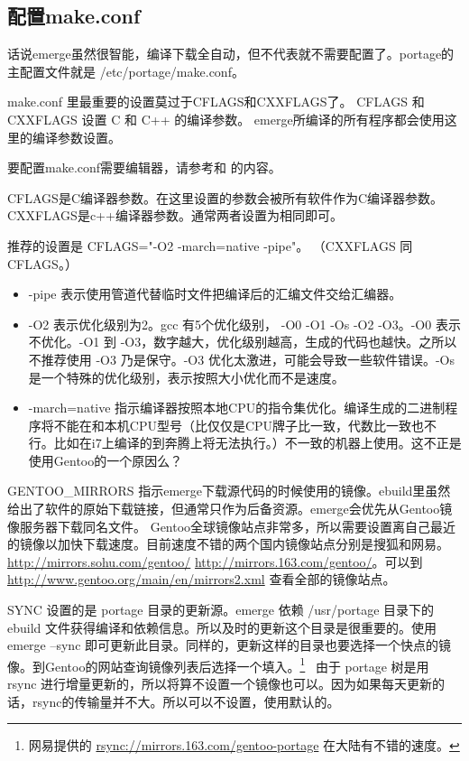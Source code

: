 \subsection{配置make.conf}

话说emerge虽然很智能，编译下载全自动，但不代表就不需要配置了。portage的主配置文件就是 /etc/portage/make.conf。

make.conf 里最重要的设置莫过于CFLAGS和CXXFLAGS了。 
CFLAGS 和 CXXFLAGS 设置 C 和 C++ 的编译参数。
emerge所编译的所有程序都会使用这里的编译参数设置。

要配置make.conf需要编辑器，请参考和
的内容。

CFLAGS是C编译器参数。在这里设置的参数会被所有软件作为C编译器参数。CXXFLAGS是c++编译器参数。通常两者设置为相同即可。

推荐的设置是 CFLAGS="-O2 -march=native -pipe"。
（CXXFLAGS 同 CFLAGS。）

\begin{itemize}
\item -pipe 表示使用管道代替临时文件把编译后的汇编文件交给汇编器。
\item -O2 表示优化级别为2。gcc 有5个优化级别， -O0 -O1 -Os -O2 -O3。-O0 表示不优化。-O1 到 -O3，数字越大，优化级别越高，生成的代码也越快。之所以不推荐使用 -O3 乃是保守。-O3 优化太激进，可能会导致一些软件错误。-Os是一个特殊的优化级别，表示按照大小优化而不是速度。
\item -march=native 指示编译器按照本地CPU的指令集优化。编译生成的二进制程序将不能在和本机CPU型号（比仅仅是CPU牌子比一致，代数比一致也不行。比如在i7上编译的到奔腾上将无法执行。）不一致的机器上使用。这不正是使用Gentoo的一个原因么？
\end{itemize}


GENTOO\_MIRRORS 指示emerge下载源代码的时候使用的镜像。ebuild里虽然给出了软件的原始下载链接，但通常只作为后备资源。emerge会优先从Gentoo镜像服务器下载同名文件。
Gentoo全球镜像站点非常多，所以需要设置离自己最近的镜像以加快下载速度。目前速度不错的两个国内镜像站点分别是搜狐和网易。\url{http://mirrors.sohu.com/gentoo/} \url{http://mirrors.163.com/gentoo/}。可以到 \url{http://www.gentoo.org/main/en/mirrors2.xml} 查看全部的镜像站点。

SYNC %
设置的是 portage 目录的更新源。emerge 依赖 /usr/portage 目录下的 ebuild 文件获得编译和依赖信息。所以及时的更新这个目录是很重要的。使用 emerge --sync 
即可更新此目录。同样的，更新这样的目录也要选择一个快点的镜像。到Gentoo的网站查询镜像列表后选择一个填入。\footnote{网易提供的 \url{rsync://mirrors.163.com/gentoo-portage} 在大陆有不错的速度。}~ 由于 portage 树是用 rsync 进行增量更新的，所以将算不设置一个镜像也可以。因为如果每天更新的话，rsync的传输量并不大。所以可以不设置，使用默认的。

